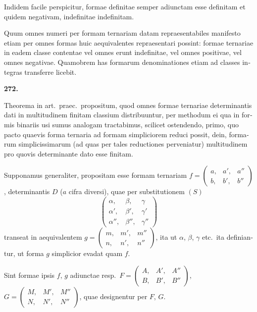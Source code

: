 \documentclass[12pt,a4paper]{article}
\theoremstyle{plain}
\theoremstyle{definition}
\theoremstyle{remark}
\begin{document}
\begin{otherlanguage}{latin}
Indidem facile perspicitur, formae definitae semper adiunctam esse definitam et quidem negativam, indefinitae indefinitam.

Quum omnes numeri per formam ternariam datam repraesentabiles manifesto etiam per omnes formas huic aequivalentes repraesentari possint: formae ternariae in eadem classe contentae vel omnes erunt indefinitae, vel omnes positivae, vel omnes negativae. Quamobrem has formarum denominationes etiam ad classes integras transferre licebit.

\end{otherlanguage}

\begin{otherlanguage}{latin}

\textbf{272.}

Theorema in art.\ praec.\ propositum, quod omnes formae ternariae determinantis dati in multitudinem finitam classium distribuuntur, per methodum ei qua in formis binariis usi sumus analogam tractabimus, scilicet ostendendo, primo, quo pacto quaevis forma ternaria ad formam simpliciorem reduci possit, dein, formarum simplicissimarum (ad quas per tales reductiones perveniatur) multitudinem pro quovis determinante dato esse finitam.

Supponamus generaliter, propositam esse formam ternariam $f = \begin{pmatrix} a, & a', & a'' \\ b, & b', & b'' \end{pmatrix}$, determinantis $D$ ($a$ cifra diversi), quae per substitutionem $(S)$
\[
\begin{pmatrix} \alpha, & \beta, & \gamma \\ \alpha', & \beta', & \gamma' \\ \alpha'', & \beta'', & \gamma'' \end{pmatrix}
\]
transeat in aequivalentem $g = \begin{pmatrix} m, & m', & m'' \\ n, & n', & n'' \end{pmatrix}$, ita ut $\alpha$, $\beta$, $\gamma$ etc.\ ita definiantur, ut forma $g$ simplicior evadat quam $f$.

Sint formae ipsis $f$, $g$ adiunctae resp.\ $F = \begin{pmatrix} A, & A', & A'' \\ B, & B', & B'' \end{pmatrix}$, $G = \begin{pmatrix} M, & M', & M'' \\ N, & N', & N'' \end{pmatrix}$, quae designentur per $F$, $G$.


\end{otherlanguage}
\end{document}
